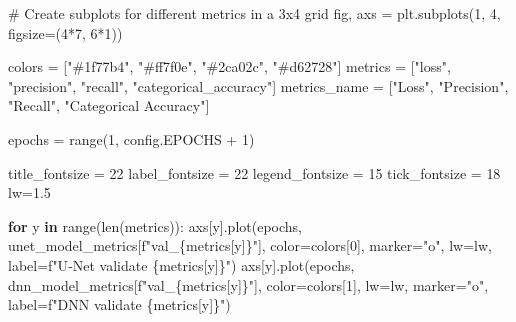 \documentclass[
  letterpaper,
  DIV=11,
  numbers=noendperiod]{scrreprt}
\newenvironment{Shaded}{\begin{snugshade}}{\end{snugshade}}
\newcommand{\BuiltInTok}[1]{\textcolor[rgb]{0.00,0.23,0.31}{#1}}
\newcommand{\CommentTok}[1]{\textcolor[rgb]{0.37,0.37,0.37}{#1}}
\newcommand{\ControlFlowTok}[1]{\textcolor[rgb]{0.00,0.23,0.31}{\textbf{#1}}}
\newcommand{\DecValTok}[1]{\textcolor[rgb]{0.68,0.00,0.00}{#1}}
\newcommand{\FloatTok}[1]{\textcolor[rgb]{0.68,0.00,0.00}{#1}}
\newcommand{\KeywordTok}[1]{\textcolor[rgb]{0.00,0.23,0.31}{\textbf{#1}}}
\newcommand{\NormalTok}[1]{\textcolor[rgb]{0.00,0.23,0.31}{#1}}
\newcommand{\OperatorTok}[1]{\textcolor[rgb]{0.37,0.37,0.37}{#1}}
\newcommand{\SpecialCharTok}[1]{\textcolor[rgb]{0.37,0.37,0.37}{#1}}
\newcommand{\SpecialStringTok}[1]{\textcolor[rgb]{0.13,0.47,0.30}{#1}}
\newcommand{\StringTok}[1]{\textcolor[rgb]{0.13,0.47,0.30}{#1}}
\begin{document}
\begin{Shaded}
\begin{Highlighting}[]
\CommentTok{\# Create subplots for different metrics in a 3x4 grid}
\NormalTok{fig, axs }\OperatorTok{=}\NormalTok{ plt.subplots(}\DecValTok{1}\NormalTok{, }\DecValTok{4}\NormalTok{, figsize}\OperatorTok{=}\NormalTok{(}\DecValTok{4}\OperatorTok{*}\DecValTok{7}\NormalTok{, }\DecValTok{6}\OperatorTok{*}\DecValTok{1}\NormalTok{))}

\NormalTok{colors }\OperatorTok{=}\NormalTok{ [}\StringTok{"\#1f77b4"}\NormalTok{, }\StringTok{"\#ff7f0e"}\NormalTok{, }\StringTok{"\#2ca02c"}\NormalTok{, }\StringTok{"\#d62728"}\NormalTok{]}
\NormalTok{metrics }\OperatorTok{=}\NormalTok{ [}\StringTok{"loss"}\NormalTok{, }\StringTok{"precision"}\NormalTok{, }\StringTok{"recall"}\NormalTok{, }\StringTok{"categorical\_accuracy"}\NormalTok{]}
\NormalTok{metrics\_name }\OperatorTok{=}\NormalTok{ [}\StringTok{"Loss"}\NormalTok{, }\StringTok{"Precision"}\NormalTok{, }\StringTok{"Recall"}\NormalTok{, }\StringTok{"Categorical Accuracy"}\NormalTok{]}

\NormalTok{epochs }\OperatorTok{=} \BuiltInTok{range}\NormalTok{(}\DecValTok{1}\NormalTok{, config.EPOCHS }\OperatorTok{+} \DecValTok{1}\NormalTok{)}

\NormalTok{title\_fontsize }\OperatorTok{=} \DecValTok{22}
\NormalTok{label\_fontsize }\OperatorTok{=} \DecValTok{22}
\NormalTok{legend\_fontsize }\OperatorTok{=} \DecValTok{15}
\NormalTok{tick\_fontsize }\OperatorTok{=} \DecValTok{18}
\NormalTok{lw}\OperatorTok{=}\FloatTok{1.5}

\ControlFlowTok{for}\NormalTok{ y }\KeywordTok{in} \BuiltInTok{range}\NormalTok{(}\BuiltInTok{len}\NormalTok{(metrics)):}
\NormalTok{    axs[y].plot(epochs, unet\_model\_metrics[}\SpecialStringTok{f"val\_}\SpecialCharTok{\{}\NormalTok{metrics[y]}\SpecialCharTok{\}}\SpecialStringTok{"}\NormalTok{], color}\OperatorTok{=}\NormalTok{colors[}\DecValTok{0}\NormalTok{], marker}\OperatorTok{=}\StringTok{"o"}\NormalTok{, lw}\OperatorTok{=}\NormalTok{lw, label}\OperatorTok{=}\SpecialStringTok{f"U{-}Net validate }\SpecialCharTok{\{}\NormalTok{metrics[y]}\SpecialCharTok{\}}\SpecialStringTok{"}\NormalTok{)}
\NormalTok{    axs[y].plot(epochs, dnn\_model\_metrics[}\SpecialStringTok{f"val\_}\SpecialCharTok{\{}\NormalTok{metrics[y]}\SpecialCharTok{\}}\SpecialStringTok{"}\NormalTok{], color}\OperatorTok{=}\NormalTok{colors[}\DecValTok{1}\NormalTok{], lw}\OperatorTok{=}\NormalTok{lw, marker}\OperatorTok{=}\StringTok{"o"}\NormalTok{, label}\OperatorTok{=}\SpecialStringTok{f"DNN validate }\SpecialCharTok{\{}\NormalTok{metrics[y]}\SpecialCharTok{\}}\SpecialStringTok{"}\NormalTok{)}


\end{Highlighting}
\end{Shaded}
\end{document}
